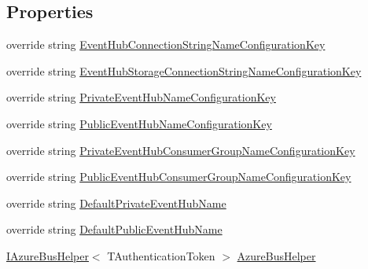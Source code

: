 \subsection*{Properties}
\begin{DoxyCompactItemize}
\item 
override string \hyperlink{classCqrs_1_1Azure_1_1ServiceBus_1_1AzureEventHubBus_a4ab2143b01ac269db357fa9dff613a4a}{Event\+Hub\+Connection\+String\+Name\+Configuration\+Key}
\item 
override string \hyperlink{classCqrs_1_1Azure_1_1ServiceBus_1_1AzureEventHubBus_a56af12dd26c6a34ba444dcc8b0110337}{Event\+Hub\+Storage\+Connection\+String\+Name\+Configuration\+Key}
\item 
override string \hyperlink{classCqrs_1_1Azure_1_1ServiceBus_1_1AzureEventHubBus_a2ad236850ff85bdb8dcc252af7b123c7}{Private\+Event\+Hub\+Name\+Configuration\+Key}
\item 
override string \hyperlink{classCqrs_1_1Azure_1_1ServiceBus_1_1AzureEventHubBus_afd3a436ec413b208d201dab7750f8f9e}{Public\+Event\+Hub\+Name\+Configuration\+Key}
\item 
override string \hyperlink{classCqrs_1_1Azure_1_1ServiceBus_1_1AzureEventHubBus_a2ef9980a763a789179a009d6e0972175}{Private\+Event\+Hub\+Consumer\+Group\+Name\+Configuration\+Key}
\item 
override string \hyperlink{classCqrs_1_1Azure_1_1ServiceBus_1_1AzureEventHubBus_a5e03e9ddac66cf136bde75e40fc11afc}{Public\+Event\+Hub\+Consumer\+Group\+Name\+Configuration\+Key}
\item 
override string \hyperlink{classCqrs_1_1Azure_1_1ServiceBus_1_1AzureEventHubBus_a8903cb16fa7bfc2396f249c48fe42a60}{Default\+Private\+Event\+Hub\+Name}
\item 
override string \hyperlink{classCqrs_1_1Azure_1_1ServiceBus_1_1AzureEventHubBus_a0d3aa3a2e36b52d131039955700955cb}{Default\+Public\+Event\+Hub\+Name}
\item 
\hyperlink{interfaceCqrs_1_1Azure_1_1ServiceBus_1_1IAzureBusHelper}{I\+Azure\+Bus\+Helper}$<$ T\+Authentication\+Token $>$ \hyperlink{classCqrs_1_1Azure_1_1ServiceBus_1_1AzureEventHubBus_ac70c513a41f42208cc3332d4ed855af8}{Azure\+Bus\+Helper}
\end{DoxyCompactItemize}
